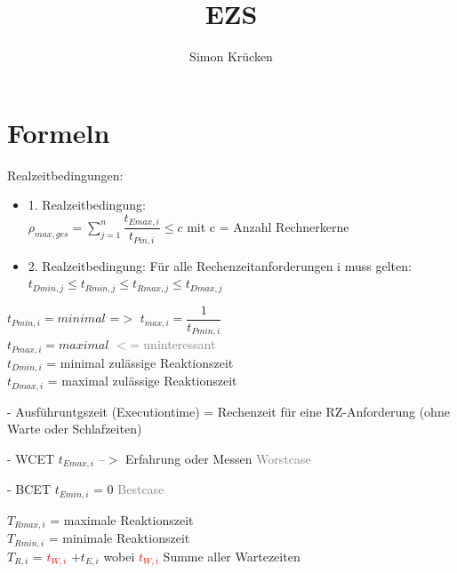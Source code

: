 \documentclass[12pt,a4paper,oneside,ngerman]{article}
\title{EZS}
\author{Simon Krücken}
\begin{document}
    
\begin{titlepage}
\end{titlepage}
\tableofcontents

\section[Formeln]{Formeln}
Realzeitbedingungen:\\
\begin{itemize}
	\item 1. Realzeitbedingung:\\ \(\rho_{max,ges} = \displaystyle\sum_{j=1}^n \dfrac{t_{Emax,i}}{t_{Pin,i}} \leq c\) mit c = Anzahl Rechnerkerne
	\item 2. Realzeitbedingung: Für alle Rechenzeitanforderungen i muss gelten:\\ \( t_{Dmin,j} \leq t_{Rmin,j} \leq t_{Rmax,j} \leq t_{Dmax,j} \)
\end{itemize}

\(t_{Pmin,i} = minimal\) =$>$ \(t_{max,i} = \dfrac{1}{ t_{Pmin,i} }\) \\
\(t_{Pmax,i} = maximal\) \textcolor{gray}{$<$= uninteressant} \\
\(t_{Dmin,i}\) = minimal zulässige Reaktionszeit \\
\(t_{Dmax,i}\) = maximal zulässige Reaktionszeit

\begin{description}
    \item - Ausführuntgszeit (Executiontime) = Rechenzeit für eine RZ-Anforderung (ohne Warte oder Schlafzeiten)	
        \begin{description}
            \item - WCET \(t_{Emax,i}\) --$>$ Erfahrung oder Messen \textcolor{gray}{Worstcase}
            \item - BCET \(t_{Emin,i}\) = 0 \textcolor{gray}{Bestcase}
        \end{description}
    \end{description}

\(T_{Rmax,i}\) = maximale Reaktionszeit \\
\(T_{Rmin,i}\) = minimale Reaktionszeit \\
\(T_{R,i}\) = \textcolor{red}{\(t_{W,i}\)} \(+ t_{E,i}\) wobei \textcolor{red}{ \(t_{W,i}\) } Summe aller Wartezeiten
\end{document}

